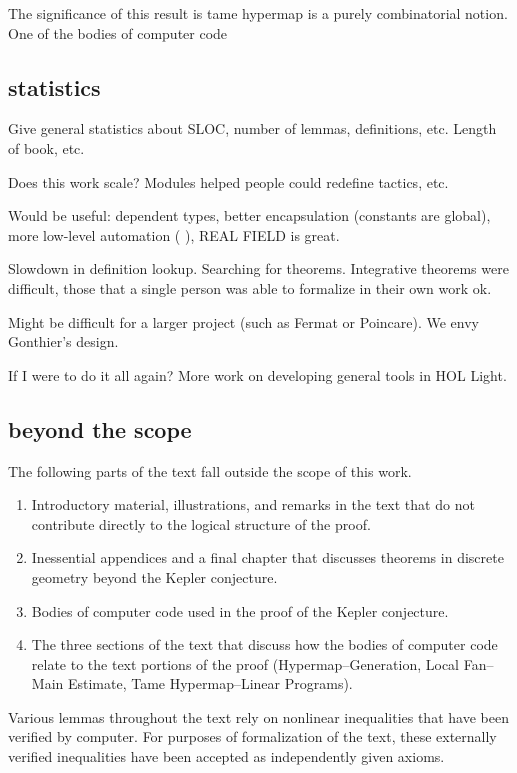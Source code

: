 \documentclass{llncs}
\begin{document}
The significance of this result is  tame hypermap is a purely combinatorial
notion.  One of the bodies of computer code 

\subsection{statistics}

Give general statistics about SLOC, number of lemmas, definitions, etc.
Length of book, etc.

Does this work scale?  Modules helped people could redefine tactics, etc.

Would be useful:
dependent types, better encapsulation (constants are global),
more low-level automation (  ),  REAL FIELD is great.

Slowdown in definition lookup.  Searching for theorems.  Integrative
theorems were difficult, those that a single person was able to formalize
in their own work ok.

Might be difficult for a larger project (such as Fermat or Poincare).
We envy Gonthier's design.

If I were to do it all again?  More work on developing general tools in HOL Light.


\subsection{beyond the scope}

The following parts of the text fall outside the scope of this work.

\begin{enumerate}
\item Introductory material, illustrations, and remarks in the text
  that do not contribute directly to the logical structure of the
  proof.
\item Inessential appendices and a final chapter that discusses
  theorems in discrete geometry beyond the Kepler conjecture.
\item Bodies of computer code used in the proof of the Kepler
  conjecture.
\item The three sections of the text that discuss how the bodies of
  computer code relate to the text portions of the proof
  (Hypermap--Generation, Local Fan--Main Estimate, Tame
  Hypermap--Linear Programs).
\end{enumerate}

Various lemmas throughout the text rely on nonlinear inequalities that
have been verified by computer.  For purposes of formalization of the
text, these externally verified inequalities have been accepted as
independently given axioms.
\end{document}

